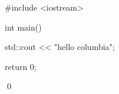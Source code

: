 \begin{console}
#include <iostream>

int main()
{
    std::cout << "hello columbia\n";
    
    return 0;
}
\end{console}
\qed

